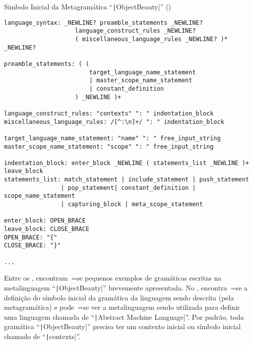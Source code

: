 \begin{code}
\caption[Simbolo Inicial da Metagramática ``ObjectBeauty'']{Simbolo Inicial da Metagramática ``\texttt|ObjectBeauty|'' ()}
\label{code:simboloInicialDaMetagramatica}
\begin{verbatim}
language_syntax: _NEWLINE? preamble_statements _NEWLINE?
                    language_construct_rules _NEWLINE?
                    ( miscellaneous_language_rules _NEWLINE? )* _NEWLINE?

preamble_statements: ( (
                        target_language_name_statement
                        | master_scope_name_statement
                        | constant_definition
                    ) _NEWLINE )+

language_construct_rules: "contexts" ": " indentation_block
miscellaneous_language_rules: /[^:\n]+/ ": " indentation_block

target_language_name_statement: "name" ": " free_input_string
master_scope_name_statement: "scope" ": " free_input_string

indentation_block: enter_block _NEWLINE ( statements_list _NEWLINE )+ leave_block
statements_list: match_statement | include_statement | push_statement
                | pop_statement| constant_definition | scope_name_statement
                | capturing_block | meta_scope_statement

enter_block: OPEN_BRACE
leave_block: CLOSE_BRACE
OPEN_BRACE: "{"
CLOSE_BRACE: "}"

...
\end{verbatim}
\end{code}

Entre os ,
encontram~=se pequenos exemplos de gramáticas escritas na metalinguagem ``\texttt|ObjectBeauty|'' brevemente apresentada.
No ,
encontra~=se a definição do símbolo inicial da gramática da linguagem sendo descrita (pela metagramática) e
pode~=se ver a metalinguagem sendo utilizada para definir uma linguagem chamada de ``\texttt|Abstract Machine Language|''.
Por padrão,
toda gramática ``\texttt|ObjectBeauty|'' precisa ter um contexto inicial ou
símbolo inicial chamado de ``\texttt|contexts|''.

